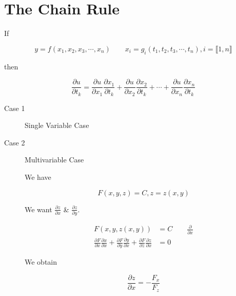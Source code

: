 
\section{The Chain Rule}

\begin{definition}
	If

	\begin{equation}
		y = f(x_1, x_2, x_3, \cdots, x_n) \qquad x_i = g_i(t_1, t_2, t_3, \cdots, t_n), i = \llbracket 1, n \rrbracket
	\end{equation}

	then

	\begin{equation}
		\frac{\partial u}{\partial t_k} = \frac{\partial u}{\partial x_1} \frac{\partial x_1}{\partial t_k} + \frac{\partial u}{\partial x_2} \frac{\partial x_2}{\partial t_k} + \cdots + \frac{\partial u}{\partial x_n} \frac{\partial x_n}{\partial t_k}
	\end{equation}
\end{definition}

\begin{theorem}
	\begin{description}
		\item[Case 1] Single Variable Case
		
		\item[Case 2] Multivariable Case
		
		We have

		\begin{equation}
			F(x, y, z) = C, z = z(x, y)
		\end{equation}

		We want $\frac{\partial z}{\partial x}$ \& $\frac{\partial z}{\partial y}$.

		\begin{align}
			F(x, y, z(x, y)) &= C \qquad \frac{\partial}{\partial x}\\
			\frac{\partial F}{\partial x} \frac{\partial x}{\partial x} + \frac{\partial F}{\partial y} \frac{\partial y}{\partial x} + \frac{\partial F}{\partial z} \frac{\partial z}{\partial x} &= 0
		\end{align}

		We obtain

		\begin{equation}
			\boxed{\frac{\partial z}{\partial x} = - \frac{F_x}{F_z}}
		\end{equation}
	\end{description}
\end{theorem}

